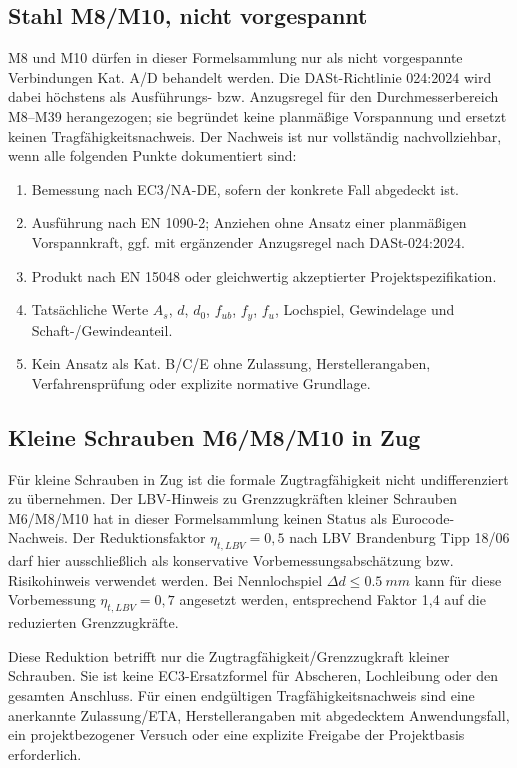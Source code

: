 \documentclass[10pt,a4paper]{article}
\begin{document}
\subsection{Stahl M8/M10, nicht vorgespannt}
M8 und M10 dürfen in dieser Formelsammlung nur als nicht vorgespannte Verbindungen Kat. A/D behandelt werden. Die DASt-Richtlinie 024:2024 wird dabei höchstens als Ausführungs- bzw. Anzugsregel für den Durchmesserbereich M8--M39 herangezogen; sie begründet keine planmäßige Vorspannung und ersetzt keinen Tragfähigkeitsnachweis. Der Nachweis ist nur vollständig nachvollziehbar, wenn alle folgenden Punkte dokumentiert sind:
\begin{enumerate}
\item Bemessung nach EC3/NA-DE, sofern der konkrete Fall abgedeckt ist.
\item Ausführung nach EN 1090-2; Anziehen ohne Ansatz einer planmäßigen Vorspannkraft, ggf. mit ergänzender Anzugsregel nach DASt-024:2024.
\item Produkt nach EN 15048 oder gleichwertig akzeptierter Projektspezifikation.
\item Tatsächliche Werte $A_s$, $d$, $d_0$, $f_{ub}$, $f_y$, $f_u$, Lochspiel, Gewindelage und Schaft-/Gewindeanteil.
\item Kein Ansatz als Kat. B/C/E ohne Zulassung, Herstellerangaben, Verfahrensprüfung oder explizite normative Grundlage.
\end{enumerate}

\subsection{Kleine Schrauben M6/M8/M10 in Zug}
Für kleine Schrauben in Zug ist die formale Zugtragfähigkeit nicht undifferenziert zu übernehmen. Der LBV-Hinweis zu Grenzzugkräften kleiner Schrauben M6/M8/M10 hat in dieser Formelsammlung keinen Status als Eurocode-Nachweis. Der Reduktionsfaktor $\eta_{t,LBV}=0{,}5$ nach LBV Brandenburg Tipp 18/06 darf hier ausschließlich als konservative Vorbemessungsabschätzung bzw. Risikohinweis verwendet werden. Bei Nennlochspiel $\Delta d\leq\SI{0,5}{mm}$ kann für diese Vorbemessung $\eta_{t,LBV}=0{,}7$ angesetzt werden, entsprechend Faktor 1,4 auf die reduzierten Grenzzugkräfte.

\begin{warnbox}
Diese Reduktion betrifft nur die Zugtragfähigkeit/Grenzzugkraft kleiner Schrauben. Sie ist keine EC3-Ersatzformel für Abscheren, Lochleibung oder den gesamten Anschluss. Für einen endgültigen Tragfähigkeitsnachweis sind eine anerkannte Zulassung/ETA, Herstellerangaben mit abgedecktem Anwendungsfall, ein projektbezogener Versuch oder eine explizite Freigabe der Projektbasis erforderlich.
\end{warnbox}
\end{document}
